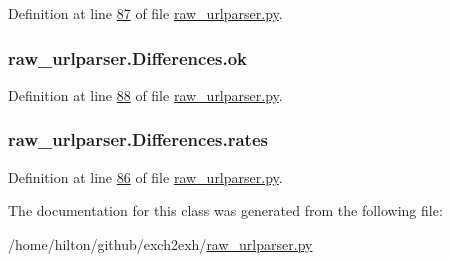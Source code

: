 Definition at line \hyperlink{raw__urlparser_8py_source_l00087}{87} of file \hyperlink{raw__urlparser_8py_source}{raw\+\_\+urlparser.\+py}.

\subsubsection[{\texorpdfstring{ok}{ok}}]{\setlength{\rightskip}{0pt plus 5cm}raw\+\_\+urlparser.\+Differences.\+ok}\hypertarget{classraw__urlparser_1_1_differences_a46fe97bedb977585a0b27d7408ace118}{}\label{classraw__urlparser_1_1_differences_a46fe97bedb977585a0b27d7408ace118}


Definition at line \hyperlink{raw__urlparser_8py_source_l00088}{88} of file \hyperlink{raw__urlparser_8py_source}{raw\+\_\+urlparser.\+py}.

\subsubsection[{\texorpdfstring{rates}{rates}}]{\setlength{\rightskip}{0pt plus 5cm}raw\+\_\+urlparser.\+Differences.\+rates}\hypertarget{classraw__urlparser_1_1_differences_ad4e7eadb659a1cdcba90793cc52af174}{}\label{classraw__urlparser_1_1_differences_ad4e7eadb659a1cdcba90793cc52af174}


Definition at line \hyperlink{raw__urlparser_8py_source_l00086}{86} of file \hyperlink{raw__urlparser_8py_source}{raw\+\_\+urlparser.\+py}.



The documentation for this class was generated from the following file\+:\begin{DoxyCompactItemize}
\item 
/home/hilton/github/exch2exh/\hyperlink{raw__urlparser_8py}{raw\+\_\+urlparser.\+py}\end{DoxyCompactItemize}
